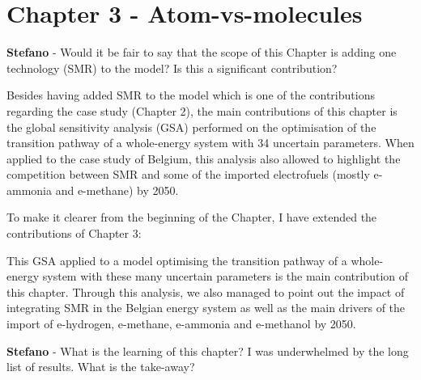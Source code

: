 \documentclass[12pt,a4paper]{article}
\begin{document}
\section{Chapter 3 - Atom-vs-molecules}
\label{Chap_atom_vs_molecules}

\begin{mdframed}[style=comment] %
{\color{orange} \textbf{Stefano}} - Would it be fair to say that the scope of this Chapter is adding one technology (SMR) to the model? Is this a significant contribution?
\end{mdframed}

\noindent Besides having added SMR to the model which is one of the contributions regarding the case study (Chapter 2), the main contributions of this chapter is the global sensitivity analysis (GSA) performed on the optimisation of the transition pathway of a whole-energy system with 34 uncertain parameters. When applied to the case study of Belgium, this analysis also allowed to highlight the competition between SMR and some of the imported electrofuels (mostly e-ammonia and e-methane) by 2050. 

To make it clearer from the beginning of the Chapter, I have extended {\color{blue}the contributions of Chapter 3}:

\begin{mdframed}[style=manuscript] %
This GSA applied to a model optimising the transition pathway of a whole-energy system with these many uncertain parameters is the main contribution of this chapter. Through this analysis, we also managed to point out the impact of integrating SMR in the Belgian energy system as well as the main drivers of the import of e-hydrogen, e-methane, e-ammonia and e-methanol by 2050.
\end{mdframed}

\begin{mdframed}[style=comment] %
{\color{orange} \textbf{Stefano}} - What is the learning of this chapter? I was underwhelmed by the long list of results. What is the take-away?
\end{mdframed}
\end{document}

